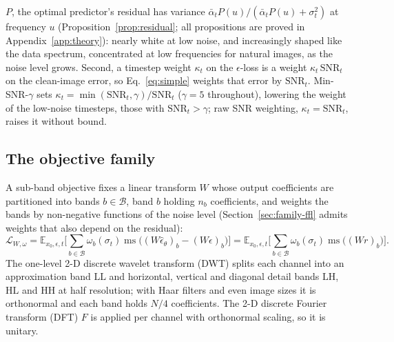 $P$, the optimal predictor's residual has variance
$\bar\alpha_t P(u)/(\bar\alpha_t P(u) + \sigma_t^2)$ at frequency $u$
(Proposition~\ref{prop:residual}; all propositions are proved in
Appendix~\ref{app:theory}): nearly white
at low noise, and increasingly shaped like the data spectrum, concentrated at
low frequencies for natural images, as the noise level grows. Second, a
timestep weight $\kappa_t$ on the $\epsilon$-loss is a weight
$\kappa_t\,\mathrm{SNR}_t$ on the clean-image error, so
Eq.~\eqref{eq:simple} weights that error by $\mathrm{SNR}_t$.
Min-SNR-$\gamma$ \citep{hang2023efficient} sets
$\kappa_t = \min(\mathrm{SNR}_t, \gamma)/\mathrm{SNR}_t$ ($\gamma = 5$
throughout), lowering the weight of the low-noise timesteps, those with
$\mathrm{SNR}_t > \gamma$; raw SNR weighting, $\kappa_t = \mathrm{SNR}_t$,
raises it without bound.

\subsection{The objective family}
\label{sec:family}
\label{sec:family-def}

A sub-band objective fixes a linear transform $W$ whose output coefficients are
partitioned into bands $b \in \mathcal{B}$, band $b$ holding $n_b$
coefficients, and weights the bands by non-negative functions of the noise
level (Section~\ref{sec:family-ffl} admits weights that also depend on the
residual):
\begin{equation}
  \mathcal{L}_{W,\omega}
  = \mathbb{E}_{x_0,\epsilon,t}\Big[\sum_{b \in \mathcal{B}} \omega_b(\sigma_t)
      \operatorname{ms}\big((W\hat\epsilon_\theta)_b - (W\epsilon)_b\big)\Big]
  = \mathbb{E}_{x_0,\epsilon,t}\Big[\sum_{b \in \mathcal{B}} \omega_b(\sigma_t)
      \operatorname{ms}\big((W r)_b\big)\Big].
  \label{eq:family}
\end{equation}
The one-level 2\nobreakdash-D discrete wavelet transform (DWT) \citep{mallat1989theory}
splits each channel into an approximation band $\mathrm{LL}$ and horizontal,
vertical and diagonal detail bands $\mathrm{LH}$, $\mathrm{HL}$ and
$\mathrm{HH}$ at half resolution; with Haar filters and even image sizes it
is orthonormal and each band holds $N/4$ coefficients. The 2\nobreakdash-D discrete
Fourier transform (DFT) $F$ is applied per channel with orthonormal scaling,
so it is unitary.

